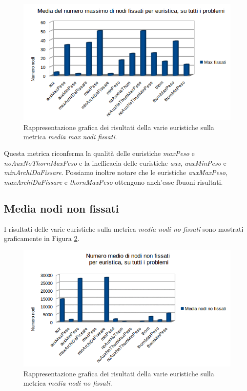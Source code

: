 \begin{figure}[H]
\includegraphics[width=\textwidth]{res/img/mediaMaxFissati.png}
\caption{Rappresentazione grafica dei risultati della varie euristiche sulla metrica \textit{media max nodi fissati}.}
\label{fig:mediaMaxNodiFissati}
\end{figure}

Questa metrica riconferma la qualità delle euristiche \textit{maxPeso} e \textit{noAuxNoThornMaxPeso} e la inefficacia delle euristiche \textit{aux}, \textit{auxMinPeso} e \textit{minArchiDaFissare}. Possiamo inoltre notare che le euristiche \textit{auxMaxPeso}, \textit{maxArchiDaFissare} e \textit{thornMaxPeso} ottengono anch'esse fbuoni risultati.

\subsection{Media nodi non fissati}
I risultati delle varie euristiche sulla metrica \textit{media nodi no fissati} sono mostrati graficamente in Figura \ref{fig:mediaNodiNoFissati}.

\begin{figure}[H]
\includegraphics[width=\textwidth]{res/img/mediaNodiNoFissati.png}
\caption{Rappresentazione grafica dei risultati della varie euristiche sulla metrica \textit{media nodi no fissati}.}
\label{fig:mediaNodiNoFissati}
\end{figure}

